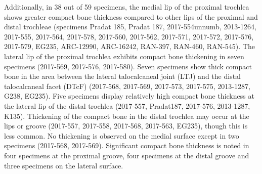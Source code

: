 \documentclass[12pt,a4paper]{article}
\begin{document}
Additionally, in 38 out of 59 specimens, the medial lip of the proximal trochlea shows greater compact bone thickness compared to other lips of the proximal and distal trochleae (specimens Pradat 185, Pradat 187, 2017-554unnumb, 2013-1264, 2017-555, 2017-564, 2017-578, 2017-560, 2017-562, 2017-571, 2017-572, 2017-576, 2017-579, EG235, ARC-12990, ARC-16242, RAN-397, RAN-460, RAN-545). The lateral lip of the proximal trochlea exhibits compact bone thickening in seven specimens (2017-569, 2017-576, 2017-580). Seven specimens show thick compact bone in the area between the lateral talocalcaneal joint (LTJ) and the distal talocalcaneal facet (DTcF) (2017-568, 2017-569, 2017-573, 2017-575, 2013-1287, G238, EG235). Five specimens display relatively high compact bone thickness at the lateral lip of the distal trochlea (2017-557, Pradat187, 2017-576, 2013-1287, K135). Thickening of the compact bone in the distal trochlea may occur at the lips or groove (2017-557, 2017-558, 2017-568, 2017-563, EG235), though this is less common. No thickening is observed on the medial surface except in two specimens (2017-568, 2017-569). Significant compact bone thickness is noted in four specimens at the proximal groove, four specimens at the distal groove and three specimens on the lateral surface.
\end{document}
